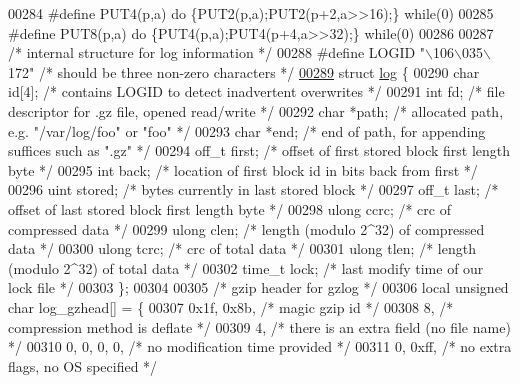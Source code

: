 \begin{DoxyCode}
00284 \textcolor{preprocessor}{#define PUT4(p,a) do \{PUT2(p,a);PUT2(p+2,a>>16);\} while(0)}
00285 \textcolor{preprocessor}{#define PUT8(p,a) do \{PUT4(p,a);PUT4(p+4,a>>32);\} while(0)}
00286 
00287 \textcolor{comment}{/* internal structure for log information */}
00288 \textcolor{preprocessor}{#define LOGID "\(\backslash\)106\(\backslash\)035\(\backslash\)172"    }\textcolor{comment}{/* should be three non-zero characters */}\textcolor{preprocessor}{}
\hyperlink{structlog}{00289} \textcolor{keyword}{struct }\hyperlink{structlog}{log} \{
00290     \textcolor{keywordtype}{char} \textcolor{keywordtype}{id}[4];     \textcolor{comment}{/* contains LOGID to detect inadvertent overwrites */}
00291     \textcolor{keywordtype}{int} fd;         \textcolor{comment}{/* file descriptor for .gz file, opened read/write */}
00292     \textcolor{keywordtype}{char} *path;     \textcolor{comment}{/* allocated path, e.g. "/var/log/foo" or "foo" */}
00293     \textcolor{keywordtype}{char} *end;      \textcolor{comment}{/* end of path, for appending suffices such as ".gz" */}
00294     off\_t first;    \textcolor{comment}{/* offset of first stored block first length byte */}
00295     \textcolor{keywordtype}{int} back;       \textcolor{comment}{/* location of first block id in bits back from first */}
00296     uint stored;    \textcolor{comment}{/* bytes currently in last stored block */}
00297     off\_t last;     \textcolor{comment}{/* offset of last stored block first length byte */}
00298     ulong ccrc;     \textcolor{comment}{/* crc of compressed data */}
00299     ulong clen;     \textcolor{comment}{/* length (modulo 2^32) of compressed data */}
00300     ulong tcrc;     \textcolor{comment}{/* crc of total data */}
00301     ulong tlen;     \textcolor{comment}{/* length (modulo 2^32) of total data */}
00302     time\_t lock;    \textcolor{comment}{/* last modify time of our lock file */}
00303 \};
00304 
00305 \textcolor{comment}{/* gzip header for gzlog */}
00306 local \textcolor{keywordtype}{unsigned} \textcolor{keywordtype}{char} log\_gzhead[] = \{
00307     0x1f, 0x8b,                 \textcolor{comment}{/* magic gzip id */}
00308     8,                          \textcolor{comment}{/* compression method is deflate */}
00309     4,                          \textcolor{comment}{/* there is an extra field (no file name) */}
00310     0, 0, 0, 0,                 \textcolor{comment}{/* no modification time provided */}
00311     0, 0xff,                    \textcolor{comment}{/* no extra flags, no OS specified */}

\end{DoxyCode}
